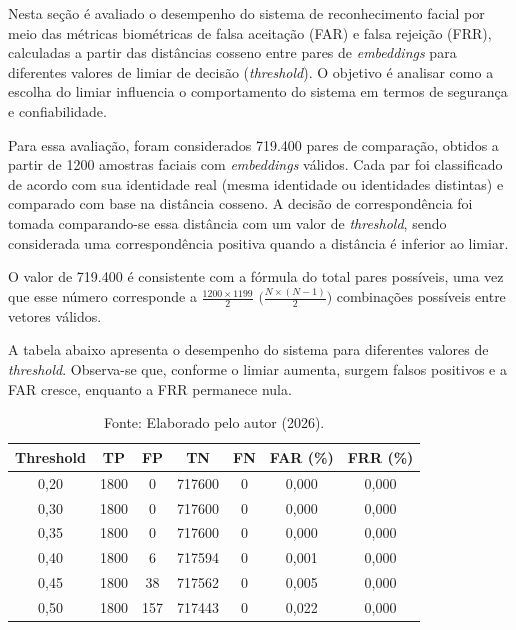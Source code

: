 Nesta seção é avaliado o desempenho do sistema de reconhecimento facial por meio das métricas biométricas de falsa aceitação (\acs{FAR}) e falsa rejeição (\acs{FRR}), calculadas a partir das distâncias cosseno entre pares de \textit{embeddings} para diferentes valores de limiar de decisão (\textit{threshold}). O objetivo é analisar como a escolha do limiar influencia o comportamento do sistema em termos de segurança e confiabilidade.

Para essa avaliação, foram considerados 719.400 pares de comparação, obtidos a partir de 1200 amostras faciais com \textit{embeddings} válidos. Cada par foi classificado de acordo com sua identidade real (mesma identidade ou identidades distintas) e comparado com base na distância cosseno. A decisão de correspondência foi tomada comparando-se essa distância com um valor de \textit{threshold}, sendo considerada uma correspondência positiva quando a distância é inferior ao limiar.

O valor de 719.400 é consistente com a fórmula do total pares possíveis, uma vez que esse número corresponde a $\frac{1200 \times 1199}{2}$ $\Big(\frac{N\times (N-1)}{2}\Big)$ combinações possíveis entre vetores válidos.

A tabela abaixo apresenta o desempenho do sistema para diferentes valores de \textit{threshold}. Observa-se que, conforme o limiar aumenta, surgem falsos positivos e a \acs{FAR} cresce, enquanto a \acs{FRR} permanece nula.

\begin{table}[H]
\centering
\caption{Resultados de desempenho para diferentes valores de \textit{threshold}, incluindo TP, FP, TN, FN, FAR e FRR}
\label{tab:table1}
\begin{tabular}{c|cccc|cc}
\hline
\textbf{Threshold} & \textbf{TP} & \textbf{FP} & \textbf{TN} & \textbf{FN} & \textbf{FAR (\%)} & \textbf{FRR (\%)} \\
\hline
0,20 & 1800 & 0  & 717600 & 0 & 0,000 & 0,000 \\
0,30 & 1800 & 0  & 717600 & 0 & 0,000 & 0,000 \\
0,35 & 1800 & 0  & 717600 & 0 & 0,000 & 0,000 \\
0,40 & 1800 & 6  & 717594 & 0 & 0,001 & 0,000 \\
0,45 & 1800 & 38  & 717562 & 0 & 0,005 & 0,000 \\
0,50 & 1800 & 157 & 717443 & 0 & 0,022 & 0,000 \\
\hline
\end{tabular}
\caption*{Fonte: Elaborado pelo autor (2026).}
\end{table}

